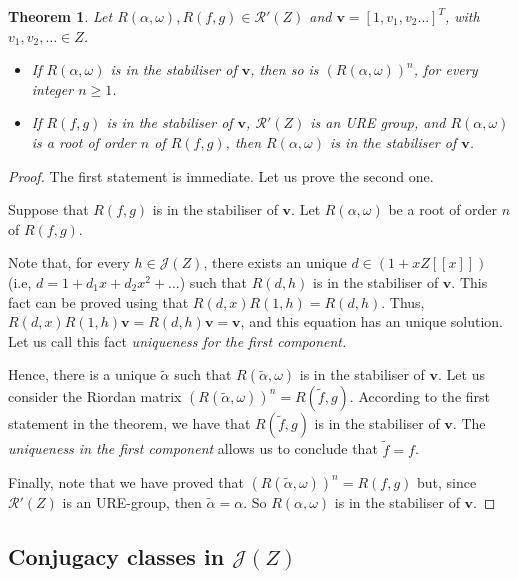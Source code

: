 \documentclass[preprint,12pt]{elsarticle}
\newtheorem{thm}{Theorem}
\begin{document}
\begin{thm} Let $R(\alpha,\omega),R(f,g)\in\mathcal R'(Z)$ and $\bm v=[1,v_1,v_2\ldots]^T$, with $v_1,v_2,\ldots\in Z$. 

\begin{itemize}

\item If $R(\alpha,\omega)$ is in the stabiliser of $\bm v$, then so is $(R(\alpha,\omega))^n$, for every integer $n\geq 1$. 

\item If $R(f,g)$ is in the stabiliser of $\bm v$, $\mathcal R'(Z)$ is an URE group, and $R(\alpha,\omega)$ is a root of order $n$ of $R(f,g)$, then $R(\alpha,\omega)$ is in the stabiliser of $\bm v$.

\end{itemize}

\end{thm}

\begin{proof} The first statement is immediate. Let us prove the second one.

Suppose that $R(f,g)$ is in the stabiliser of $\bm v$. Let $R(\alpha,\omega)$ be a root of order $n$ of $R(f,g)$. 

Note that, for every $h\in\mathcal J(Z)$, there exists an unique  $d\in (1+xZ[[x]])$ (i.e, $d = 1 + d_1 x + d_2 x^2 + \dots$) such that $R(d,h)$ is in the stabiliser of $\bm v$. This fact can be proved using that $R(d,x)R(1,h)= R(d,h)$. Thus, $R(d,x)R(1,h)\bm v = R(d,h)\bm v = \bm v$, and this equation has an unique solution. Let us call this fact \emph{uniqueness for the first component.}

Hence, there is a unique $\widetilde \alpha$ such that $R(\widetilde\alpha,\omega)$ is in the stabiliser of $\bm v$. Let us consider the Riordan matrix $(R(\widetilde\alpha,\omega))^n=R(\widetilde f,g)$. According to the first statement in the theorem, we have that $R(\widetilde f,g)$ is in the stabiliser of $\bm v$. The \emph{uniqueness in the first component} allows us to conclude that $\widetilde f=f$. 

Finally, note that we have proved that $(R(\widetilde\alpha,\omega))^n=R(f,g)$ but, since $\mathcal R'(Z)$ is an URE-group, then $\widetilde \alpha=\alpha$. So $R(\alpha,\omega)$ is in the stabiliser of $\bm v$.
\end{proof}




\subsection{Conjugacy classes in \texorpdfstring{$\mathcal J(Z)$}{J(Z)}}
\end{document}
